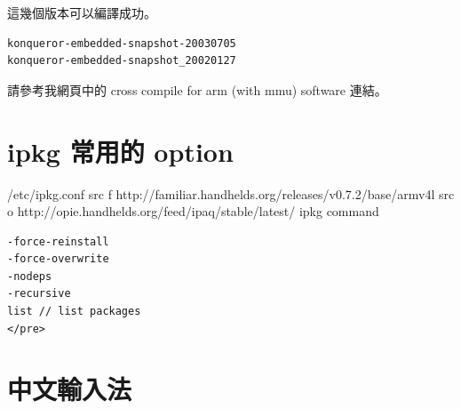 \documentclass[12pt,a4paper]{article}
\begin{document}
\begin{CJK}{UTF8}{bsmi}
這幾個版本可以編譯成功。
\begin{verbatim}
konqueror-embedded-snapshot-20030705
konqueror-embedded-snapshot_20020127
\end{verbatim}
請參考我網頁中的 cross compile for arm (with mmu) software 連結。

\section{ipkg 常用的 option}
/etc/ipkg.conf
src f http://familiar.handhelds.org/releases/v0.7.2/base/armv4l
src o http://opie.handhelds.org/feed/ipaq/stable/latest/
ipkg command
\begin{verbatim}
-force-reinstall        
-force-overwrite 
-nodeps
-recursive
list // list packages
</pre>
\end{verbatim}

\section{中文輸入法}


\end{CJK}
\end{document}
